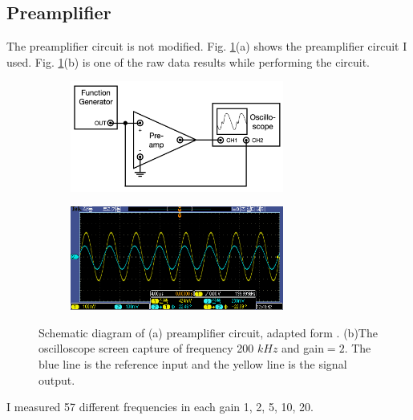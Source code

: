 \documentclass{article}
\begin{document}
\subsection{Preamplifier}
 The preamplifier circuit is not modified.
 Fig. \ref{fig: preamplifier_circuit}(a) shows the preamplifier circuit I used.
 Fig. \ref{fig: preamplifier_circuit}(b) is one of the raw data results while performing the circuit.

 \begin{figure}[ht]
  \centering
  \begin{subfigure}[b]{7cm}
      \centering
      \includegraphics[width=7cm]{../results/preamplifier_circuit.png}
      \caption{}
  \end{subfigure}
  \hfill
  \begin{subfigure}[b]{7cm}
      \centering
      \includegraphics[width=7cm]{../raw_data/TEK00071.PNG}
      \caption{}
  \end{subfigure}
  \hfill
  \caption{Schematic diagram of (a) preamplifier circuit, adapted form  \cite{signal_processor}.
  (b)The oscilloscope screen capture of frequency 200 $kHz$ and gain$=2$.
  The blue line is the reference input and the yellow line is the signal output.}
  \label{fig: preamplifier_circuit}
\end{figure}
 I measured 57 different frequencies in each gain 1, 2, 5, 10, 20.
\end{document}
